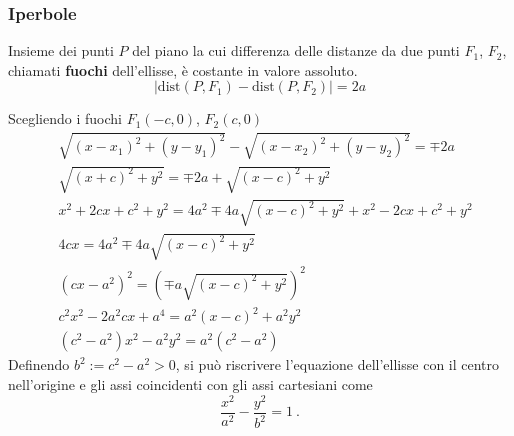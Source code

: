 \subsubsection{Iperbole}
\begin{definition}[Iperbole] Insieme dei punti $P$ del piano la cui differenza delle distanze da due punti $F_1$, $F_2$, chiamati \textbf{fuochi} dell'ellisse, è costante in valore assoluto.
    \begin{equation}
       | \text{dist}(P, F_1) - \text{dist}(P, F_2) | = 2a
    \end{equation}
\end{definition}
Scegliendo i fuochi $F_1(-c,0)$, $F_2(c,0)$
\begin{equation}
\begin{aligned}
    & \sqrt{( x - x_1 )^2 + (y-y_1)^2} - \sqrt{(x-x_2)^2 + (y-y_2)^2} = \mp 2a \\
    & \sqrt{( x + c )^2 + y^2} = \mp 2a + \sqrt{(x-c)^2 + y^2} \\
    & x^2 + 2 c x + c^2 + y^2  = 4a^2 \mp 4 a \sqrt{(x-c)^2 + y^2} +
    x^2 - 2 c x + c^2 + y^2 \\
    & 4c x = 4a^2 \mp 4a  \sqrt{(x-c)^2 + y^2} \\
    & (cx - a^2)^2 = ( \mp a  \sqrt{(x-c)^2 + y^2})^2 \\
    & c^2x^2 - 2a^2cx + a^4 = a^2(x-c)^2 + a^2 y^2 \\
    & (c^2-a^2) x^2 - a^2y^2 = a^2 (c^2-a^2) 
\end{aligned}
\end{equation}
Definendo $b^2 := c^2 - a^2 > 0$, si può riscrivere l'equazione dell'ellisse con il centro nell'origine e gli assi coincidenti con gli assi cartesiani come
\begin{equation}
  \dfrac{x^2}{a^2} - \dfrac{y^2}{b^2} = 1 \ .
\end{equation}

